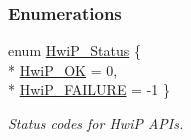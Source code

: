 \subsubsection*{Enumerations}
\begin{DoxyCompactItemize}
\item 
enum \hyperlink{_hwi_p_8h_a8f508a9a62c31a942ffc9438f53dd258}{Hwi\+P\+\_\+\+Status} \{ \\*
\hyperlink{_hwi_p_8h_a8f508a9a62c31a942ffc9438f53dd258a96e82ebb87c2c36bba1fdd072fcec2f9}{Hwi\+P\+\_\+\+O\+K} = 0, 
\\*
\hyperlink{_hwi_p_8h_a8f508a9a62c31a942ffc9438f53dd258aa0988bb08bdcf17a219385320e200000}{Hwi\+P\+\_\+\+F\+A\+I\+L\+U\+R\+E} = -\/1
 \}
\begin{DoxyCompactList}\small\item\em Status codes for Hwi\+P A\+P\+Is. \end{DoxyCompactList}\end{DoxyCompactItemize}
